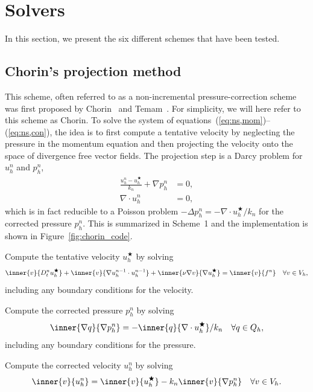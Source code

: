 \section{Solvers}
\label{methods}

In this section, we present the six different schemes that have been
tested.

\subsection{Chorin's projection method}
\label{sec:chorin}

This scheme, often referred to as a non-incremental
pressure-correction scheme was first proposed by Chorin~\cite{Chorin1968}
and Temam~\cite{Temam1969}. For simplicity, we will here refer to this
scheme as Chorin. To solve the system of
equations~(\ref{eq:ns,mom})--(\ref{eq:ns,con}), the idea is to first
compute a tentative velocity by neglecting the pressure in the
momentum equation and then projecting the velocity onto the space of
divergence free vector fields. The projection step is a Darcy problem
for $u_h^n$ and $p^n_h$,
\begin{align*}
  \frac{u_h^n -u_h^{\bigstar}}{k_n} + \nabla p^n_h &= 0, \\
 \nabla \cdot u_h^n &= 0,
\end{align*}
which is in fact reducible to a Poisson problem $-\Delta p^n_h =
- \nabla \cdot u_h^{\bigstar} / k_n$ for the corrected pressure
$p^n_h$. This is summarized in Scheme~1 and the implementation is
shown in Figure~\ref{fig:chorin_code}.

{
\item
  Compute the tentative velocity $u_h^\bigstar$ by solving
  \begin{equation}\label{eq:chorin,1}
    \inner{v}{D_t^n u_h^\bigstar}
    + \inner{v}{\nabla u_h^{n-1} \cdot u_h^{n-1}}
    + \inner{\nu \nabla v}{\nabla u_h^{\bigstar}}
    = \inner{v}{f^n} \quad \forall v \in V_h,
  \end{equation}
  including any boundary conditions for the velocity.

\item
  Compute the corrected pressure $p_h^n$ by solving
  \begin{equation}\label{eq:chorin,2}
    \inner{\nabla q}{\nabla p_h^n}
    = -\inner{q}{\nabla \cdot u_h^{\bigstar}} / k_n \quad \forall q \in Q_h,
  \end{equation}
  including any boundary conditions for the pressure.

\item
  Compute the corrected velocity $u_h^n$ by solving
  \begin{equation}\label{eq:chorin,3}
    \inner{v}{u_h^n} = \inner{v}{u_h^{\bigstar}} - k_n \inner{v}{\nabla p_h^n}
    \quad \forall v \in V_h.
  \end{equation}
}

